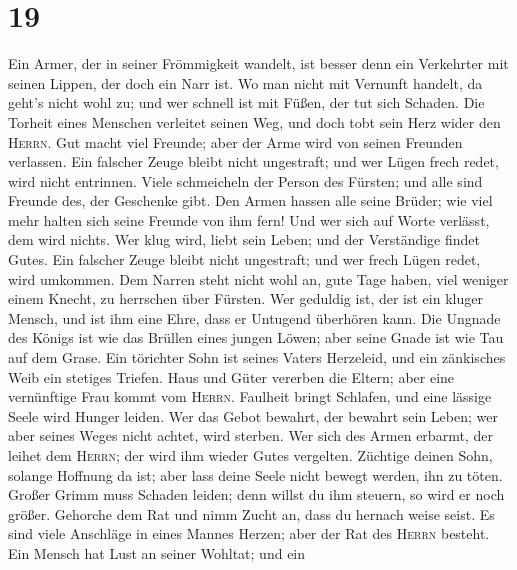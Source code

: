 \hypertarget{section-18}{%
\section{19}\label{section-18}}

 Ein Armer, der in seiner Frömmigkeit wandelt, ist besser
denn ein Verkehrter mit seinen Lippen, der doch ein Narr ist.
 Wo man nicht mit Vernunft handelt, da geht's nicht wohl
zu; und wer schnell ist mit Füßen, der tut sich Schaden. 
Die Torheit eines Menschen verleitet seinen Weg, und doch tobt sein Herz
wider den \textsc{Herrn}.  Gut macht viel Freunde; aber
der Arme wird von seinen Freunden verlassen.  Ein falscher
Zeuge bleibt nicht ungestraft; und wer Lügen frech redet, wird nicht
entrinnen.  Viele schmeicheln der Person des Fürsten; und
alle sind Freunde des, der Geschenke gibt.  Den Armen
hassen alle seine Brüder; wie viel mehr halten sich seine Freunde von
ihm fern! Und wer sich auf Worte verlässt, dem wird nichts.
 Wer klug wird, liebt sein Leben; und der Verständige
findet Gutes.  Ein falscher Zeuge bleibt nicht ungestraft;
und wer frech Lügen redet, wird umkommen.  Dem Narren
steht nicht wohl an, gute Tage haben, viel weniger einem Knecht, zu
herrschen über Fürsten.  Wer geduldig ist, der ist ein
kluger Mensch, und ist ihm eine Ehre, dass er Untugend überhören kann.
 Die Ungnade des Königs ist wie das Brüllen eines jungen
Löwen; aber seine Gnade ist wie Tau auf dem Grase.  Ein
törichter Sohn ist seines Vaters Herzeleid, und ein zänkisches Weib ein
stetiges Triefen.  Haus und Güter vererben die Eltern;
aber eine vernünftige Frau kommt vom \textsc{Herrn}. 
Faulheit bringt Schlafen, und eine lässige Seele wird Hunger leiden.
 Wer das Gebot bewahrt, der bewahrt sein Leben; wer aber
seines Weges nicht achtet, wird sterben.  Wer sich des
Armen erbarmt, der leihet dem \textsc{Herrn}; der wird ihm wieder Gutes
vergelten.  Züchtige deinen Sohn, solange Hoffnung da
ist; aber lass deine Seele nicht bewegt werden, ihn zu töten.
 Großer Grimm muss Schaden leiden; denn willst du ihm
steuern, so wird er noch größer.  Gehorche dem Rat und
nimm Zucht an, dass du hernach weise seist.  Es sind
viele Anschläge in eines Mannes Herzen; aber der Rat des \textsc{Herrn}
besteht.  Ein Mensch hat Lust an seiner Wohltat; und ein
